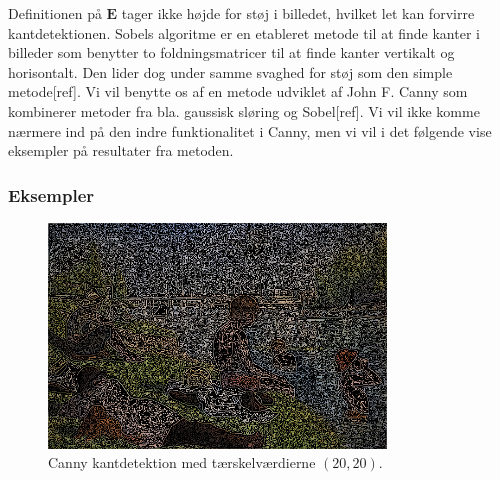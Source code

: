 {Definitionen på $\mathbf{E}$ tager ikke højde for støj i billedet,
hvilket let kan forvirre kantdetektionen. Sobels algoritme er en
etableret metode til at finde kanter i billeder som benytter to
foldningsmatricer til at finde kanter vertikalt og horisontalt. Den
lider dog under samme svaghed for støj som den simple metode[ref]. Vi
vil benytte os af en metode udviklet af John F. Canny som kombinerer
metoder fra bla. gaussisk sløring og Sobel[ref]. Vi vil ikke komme
nærmere ind på den indre funktionalitet i Canny, men vi vil i det
følgende vise eksempler på resultater fra metoden.

\subsubsection*{Eksempler}

\begin{figure}[!h]
    \begin{center}
        \includegraphics[width=0.8\textwidth]{afsnit/vores_implementation/billeder/kantdetektion/canny_20_20}
    \end{center}
    \caption[]{Canny kantdetektion med tærskelværdierne $(20, 20)$.}
    \label{bathers}
\end{figure}
}


